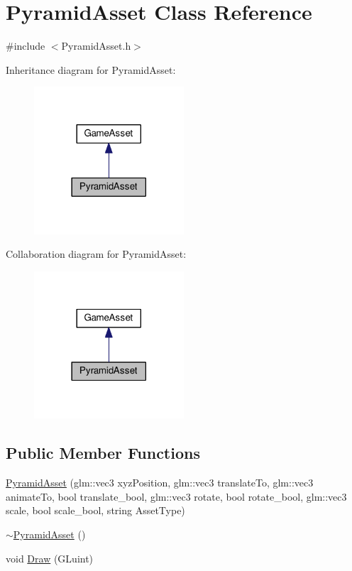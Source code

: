 \hypertarget{class_pyramid_asset}{}\section{Pyramid\+Asset Class Reference}
\label{class_pyramid_asset}


{\ttfamily \#include $<$Pyramid\+Asset.\+h$>$}



Inheritance diagram for Pyramid\+Asset\+:\nopagebreak
\begin{figure}[H]
\begin{center}
\leavevmode
\includegraphics[width=158pt]{class_pyramid_asset__inherit__graph}
\end{center}
\end{figure}


Collaboration diagram for Pyramid\+Asset\+:\nopagebreak
\begin{figure}[H]
\begin{center}
\leavevmode
\includegraphics[width=158pt]{class_pyramid_asset__coll__graph}
\end{center}
\end{figure}
\subsection*{Public Member Functions}
\begin{DoxyCompactItemize}
\item 
\hyperlink{class_pyramid_asset_a6f20b7f915760ff772740f6c94c331b1}{Pyramid\+Asset} (glm\+::vec3 xyz\+Position, glm\+::vec3 translate\+To, glm\+::vec3 animate\+To, bool translate\+\_\+bool, glm\+::vec3 rotate, bool rotate\+\_\+bool, glm\+::vec3 scale, bool scale\+\_\+bool, string Asset\+Type)
\item 
\hyperlink{class_pyramid_asset_afb388a196f43a3808b2d4f6fdb89ee84}{$\sim$\+Pyramid\+Asset} ()
\item 
void \hyperlink{class_pyramid_asset_aaea45da4956d79ec9ab96e9d0ccef3fe}{Draw} (G\+Luint)
\end{DoxyCompactItemize}


